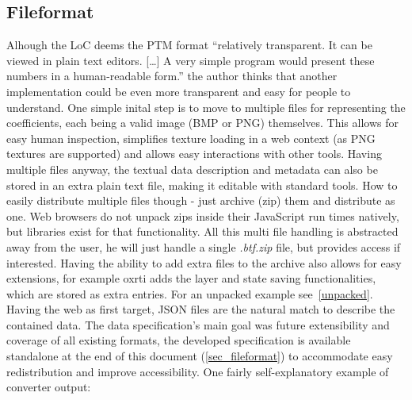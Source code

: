 \subsection{Fileformat}
Alhough the LoC deems the PTM format ``relatively transparent. It can be viewed
in plain text editors. [\ldots] A very simple program would present these
numbers in a human-readable
form.''\cite*{library_of_congress_polynomial_2018} the author thinks that
another implementation could be even more transparent and easy for people to
understand. One simple inital step is to move to multiple files for representing
the coefficients, each being a valid image (BMP or PNG) themselves. This allows
for easy human inspection, simplifies texture loading in a web context (as PNG
textures are supported) and allows easy interactions with other tools. Having
multiple files anyway, the textual data description and metadata can also be
stored in an extra plain text file, making it editable with standard tools. How
to easily distribute multiple files though - just archive (zip) them and distribute as
one. Web browsers do not unpack zips inside their JavaScript run times natively,
but libraries\cite*{noauthor_jszip_nodate} exist for that functionality. All
this multi file handling is abstracted away from the user, he will just handle a
single \emph{.btf.zip} file, but provides access if interested. Having the
ability to add extra files to the archive also allows for easy extensions, for
example oxrti adds the layer and state saving functionalities, which are stored
as extra entries. For an unpacked example see~\autoref{unpacked}. Having the web
as first target, JSON files are the natural match to describe the contained
data. The data specification's main goal was future extensibility and  coverage
of all existing formats, the developed specification is available standalone at the end of this document
(\autoref{sec_fileformat}) to accommodate easy redistribution and improve
accessibility. One fairly self-explanatory example of converter output:
